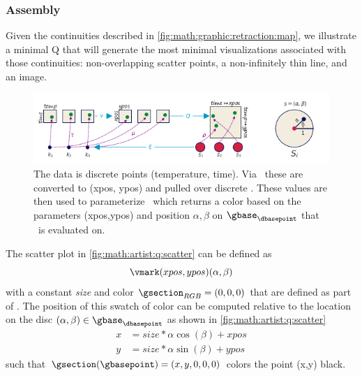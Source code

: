\documentclass[../main.tex]{subfiles}
\begin{document}
\subsubsection{Assembly \vmark}
Given the continuities described in \ref{fig:math:graphic:retraction:map}, 
we illustrate a minimal Q that will generate the most minimal visualizations associated with those continuities: non-overlapping scatter points, a non-infinitely thin line, and an image. 
\begin{figure}[H]
    \includegraphics[width=1\textwidth]{figures/math/scatter_with_s.png}
    \caption{The data is discrete points (temperature, time). Via \vchannel\ these are converted to (xpos, ypos) and pulled over discrete \gbase. These values are then used to parameterize \gsection\ which returns a color based on the parameters (xpos,ypos) and position $\alpha, \beta$ on $\gbase_{\dbasepoint}$ that \gsection\ is evaluated on. 
    }
    \label{fig:math:artist:q:scatter}
\end{figure}
The scatter plot in \autoref{fig:math:artist:q:scatter} can be defined as 
\begin{equation}
\vmark(xpos, ypos)(\alpha, \beta)
\label{eq:math:artist:q:scatter}
\end{equation}
with a constant \textit{size} and color $\gsection_{RGB} = (0,0,0)$ that are defined as part of \vmark. The position of this swatch of color can be computed relative to the location on the disc \((\alpha, \beta) \in \gbase_{\dbasepoint}\) as shown in \autoref{fig:math:artist:q:scatter}
\begin{align*}
x &= size *\alpha \cos(\beta) + xpos \\
y &= size *\alpha \sin(\beta) + ypos
\end{align*}
such that $\gsection(\gbasepoint) = (x, y, 0, 0, 0)$ colors the point (x,y) black. 
\end{document}
